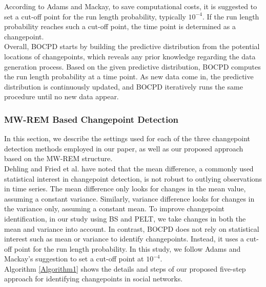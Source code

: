 \documentclass[]{interact}
\theoremstyle{plain}%
\theoremstyle{definition}
\theoremstyle{remark}
\begin{document}
{	According to Adams and Mackay\cite{adamsBayesianOnlineChangepoint2007}, to save computational costs, it is suggested to set a cut-off point for the run length probability, typically $10^{-4}$. If the run length probability reaches such a cut-off point, the time point is determined as a changepoint. \\
	
	Overall, BOCPD starts by building the predictive distribution from the potential locations of changepoints, which reveals any prior knowledge regarding the data generation process. Based on the given predictive distribution, BOCPD computes the run length probability at a time point. As new data come in, the predictive distribution is continuously updated, and BOCPD iteratively runs the same procedure until no new data appear.
	
	\subsubsection{MW-REM Based Changepoint Detection} \label{sec:our method}
	
	\hspace{0.27cm} In this section, we describe the settings used for each of the three changepoint detection methods employed in our paper, as well as our proposed approach based on the MW-REM structure. \\
	
	Dehling and Fried et al. have noted that the mean difference, a commonly used statistical interest in changepoint detection, is not robust to outlying observations in time series\cite{dehlingRobustMethodShift2020}. The mean difference only looks for changes in the mean value, assuming a constant variance. Similarly, variance difference looks for changes in the variance only, assuming a constant mean. To improve changepoint identification, in our study using BS and PELT, we take changes in both the mean and variance into account. In contrast, BOCPD does not rely on statistical interest such as mean or variance to identify changepoints. Instead, it uses a cut-off point for the run length probability. In this study, we follow Adams and Mackay's suggestion to set a cut-off point at $10^{-4}$\cite{adamsBayesianOnlineChangepoint2007}. \\
	
	Algorithm \ref{Algorithm1} shows the details and steps of our proposed five-step approach for identifying changepoints in social networks.
	
}
\end{document}
